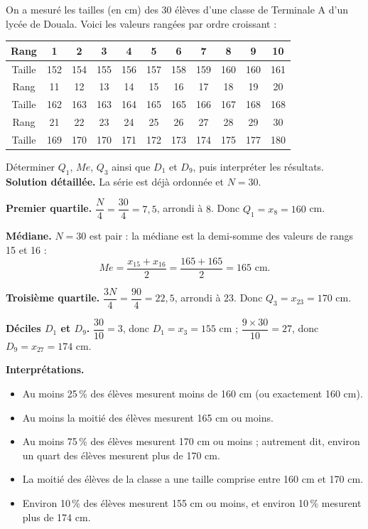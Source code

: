 \documentclass[11pt]{article}
\begin{document}
\begin{exoresolu}
On a mesuré les tailles (en cm) des 30 élèves d'une classe de Terminale A d'un lycée de Douala. Voici les valeurs rangées par ordre croissant :
\begin{center}
\begin{tabular}{|c|cccccccccc|}
\hline
\rowcolor{popblueL} Rang & 1 & 2 & 3 & 4 & 5 & 6 & 7 & 8 & 9 & 10 \\
\hline
Taille & 152 & 154 & 155 & 156 & 157 & 158 & 159 & 160 & 160 & 161 \\
\hline
\rowcolor{popblueL} Rang & 11 & 12 & 13 & 14 & 15 & 16 & 17 & 18 & 19 & 20 \\
\hline
Taille & 162 & 163 & 163 & 164 & 165 & 165 & 166 & 167 & 168 & 168 \\
\hline
\rowcolor{popblueL} Rang & 21 & 22 & 23 & 24 & 25 & 26 & 27 & 28 & 29 & 30 \\
\hline
Taille & 169 & 170 & 170 & 171 & 172 & 173 & 174 & 175 & 177 & 180 \\
\hline
\end{tabular}
\end{center}
Déterminer $Q_1$, $Me$, $Q_3$ ainsi que $D_1$ et $D_9$, puis interpréter les résultats.
\tcblower
\textbf{Solution détaillée.} La série est déjà ordonnée et $N = 30$.

\textbf{Premier quartile.} $\dfrac{N}{4} = \dfrac{30}{4} = 7,5$, arrondi à $8$. Donc $Q_1 = x_8 = 160$ cm.

\textbf{Médiane.} $N = 30$ est pair : la médiane est la demi-somme des valeurs de rangs 15 et 16 :
\[ Me = \dfrac{x_{15} + x_{16}}{2} = \dfrac{165 + 165}{2} = 165 \text{ cm}. \]

\textbf{Troisième quartile.} $\dfrac{3N}{4} = \dfrac{90}{4} = 22,5$, arrondi à $23$. Donc $Q_3 = x_{23} = 170$ cm.

\textbf{Déciles $D_1$ et $D_9$.} $\dfrac{30}{10} = 3$, donc $D_1 = x_3 = 155$ cm ; $\dfrac{9 \times 30}{10} = 27$, donc $D_9 = x_{27} = 174$ cm.

\textbf{Interprétations.}
\begin{itemize}
\item Au moins 25\,\% des élèves mesurent moins de 160 cm (ou exactement 160 cm).
\item Au moins la moitié des élèves mesurent 165 cm ou moins.
\item Au moins 75\,\% des élèves mesurent 170 cm ou moins ; autrement dit, environ un quart des élèves mesurent plus de 170 cm.
\item La moitié des élèves de la classe a une taille comprise entre 160 cm et 170 cm.
\item Environ 10\,\% des élèves mesurent 155 cm ou moins, et environ 10\,\% mesurent plus de 174 cm.
\end{itemize}
\end{exoresolu}
\end{document}
